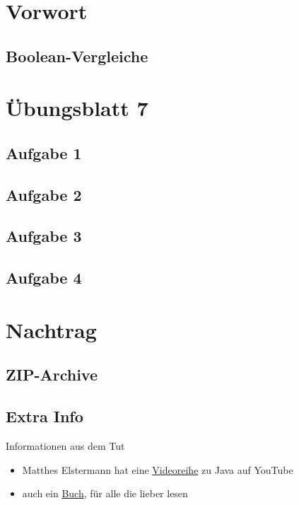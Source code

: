 \documentclass[aspectratio=169,usepdftitle=true,11pt,ngerman,t]{beamer}
\subtitle{Tutorium 8}
\date{06. Dezember 2024}
\begin{document}
\section[Ich muss noch ein wenig schimpfen...]{Vorwort}

\subsection{Boolean-Vergleiche}



\section[Java ist auch eine Insel!]{Übungsblatt 7}

\subsection{Aufgabe 1}


\subsection{Aufgabe 2}


\subsection{Aufgabe 3}


\subsection{Aufgabe 4}


\section[Von Päckchen und Paketen...]{Nachtrag}

\subsection{ZIP-Archive}


\subsection{Extra Info}
\begin{frame}{Informationen aus dem Tut}
    \begin{itemize}
        \item Matthes Elstermann hat eine \href{https://youtube.com/playlist?list=PLfSqaprsPVX14uuSNBX_OP7AYXZhoU0qr&si=5vwjXlwBQmjaXKO-}{Videoreihe} zu Java auf YouTube
        \item auch ein \href{https://www.ksp.kit.edu/site/books/m/10.5445/KSP/1000029891/}{Buch}, für alle die lieber lesen
    \end{itemize}
\end{frame}
\end{document}
